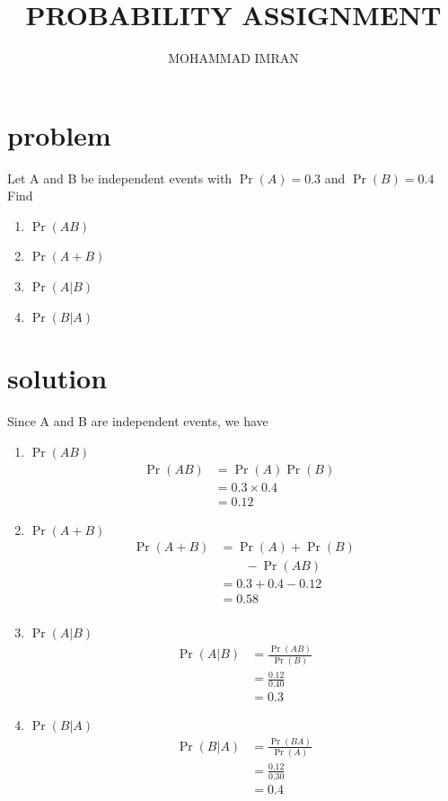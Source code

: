 \documentclass[journal,12pt,twocolumn]{article}
\title{PROBABILITY ASSIGNMENT}
\author{MOHAMMAD IMRAN}
\providecommand{\pr}[1]{\ensuremath{\Pr\left(#1\right)}}
\begin{document}
\maketitle
\bigskip

\section{problem }
Let A and B be independent events with $\pr{A}=0.3$ and $\pr{B}=0.4$ Find 
\begin{enumerate}
\item$\pr{AB}$
\item$\pr{A+B}$ 
\item$\pr{A | B}$   
\item$\pr{B | A}$
  \end{enumerate}
     
\section{solution }  


Since A and B are independent events, we have 

\begin{enumerate}

\item $\pr{AB}$
\begin{align}
\pr{AB}&=\pr{A} \pr{B}& \nonumber \\
&=0.3 \times 0.4& \nonumber \\
&=0.12&
\end{align}
\item$\pr{A+B}$
\begin{align}
\pr{A+B}&=\pr{A}+\pr{B} \nonumber \\
& \qquad -\pr{AB} \nonumber\\
&=0.3+0.4-0.12 \nonumber \\
\qquad &=0.58 \nonumber \\
\end{align}
\item $\pr{A|B}$
\begin{align}
\pr{A|B}&=\frac{\pr{AB}}{\pr{B}}  \nonumber \\
&=\frac{0.12}{0.40} \nonumber \\
\qquad &=0.3
\end{align}
\item $\pr{B|A}$
\begin{align}
\pr{B|A}&=\frac{\pr{BA}}{\pr{A}} \nonumber\\
&=\frac{0.12}{0.30} \nonumber \\
\qquad &=0.4
\end{align}
\end{enumerate}
\end{document}
